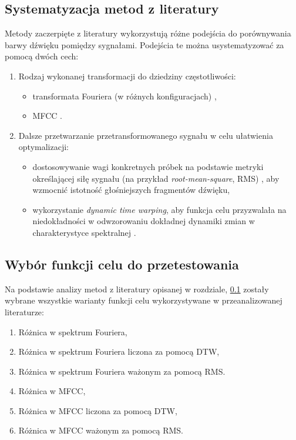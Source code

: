 \subsection{Systematyzacja metod z literatury} \label{sec:timbre_comparison_systematisation}

Metody zaczerpięte z literatury wykorzystują różne podejścia do porównywania barwy dźwięku
pomiędzy sygnałami. Podejścia te można usystematyzować za pomocą dwóch cech:

\begin{enumerate}
  \item Rodzaj wykonanej transformacji do dziedziny częstotliwości:
  \begin{itemize}
    \item transformata Fouriera (w różnych konfiguracjach) \cite{riffusion} \cite{ddx7},
    \item MFCC \cite{ieee_synth_programming} \cite{evolutionary_puredata} \cite{mfcc_dtw}.
  \end{itemize}
  \item Dalsze przetwarzanie przetransformowanego sygnału w celu ułatwienia optymalizacji:
    \begin{itemize}
      \item dostosowywanie wagi konkretnych próbek na podstawie metryki określającej siłę sygnału
        (na przykład \textit{root-mean-square}, RMS)
        \cite{parallel_evolutionary_optimization_synth_parameters},
        aby wzmocnić istotność głośniejszych fragmentów dźwięku,
      \item wykorzystanie \textit{dynamic time warping}, aby funkcja celu przyzwalała na
        niedokładności w odwzorowaniu dokładnej dynamiki zmian w charakterystyce spektralnej \cite{mfcc_dtw}.
    \end{itemize}
\end{enumerate}

\subsection{Wybór funkcji celu do przetestowania}

Na podstawie analizy metod z literatury opisanej w rozdziale,
\ref{sec:timbre_comparison_systematisation} zostały wybrane wszystkie warianty
funkcji celu wykorzystywane w przeanalizowanej literaturze:

\begin{enumerate}
  \item Różnica w spektrum Fouriera,
  \item Różnica w spektrum Fouriera liczona za pomocą DTW,
  \item Różnica w spektrum Fouriera ważonym za pomocą RMS.
  \item Różnica w MFCC,
  \item Różnica w MFCC liczona za pomocą DTW,
  \item Różnica w MFCC ważonym za pomocą RMS.
\end{enumerate}

